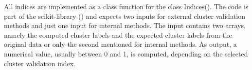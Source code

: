 All indices are implemented as a class function for the class Indices(). The code is part of the scikit-library (\cite{scikitlearn}) and expects two inputs for external cluster validation methods and just one input for internal methods. The input contains two arrays, namely the computed cluster labels and the expected cluster labels from the original data or only the second mentioned for internal methods. As output, a numerical value, usually between 0 and 1, is computed, depending on the selected cluster validation index.
